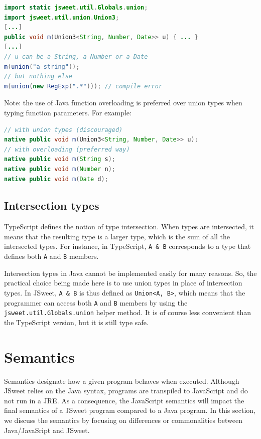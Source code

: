 \documentclass[a4paper]{report}
\begin{document}
\begin{lstlisting}[language=Java]
import static jsweet.util.Globals.union;
import jsweet.util.union.Union3;
[...]
public void m(Union3<String, Number, Date>> u) { ... }
[...]
// u can be a String, a Number or a Date
m(union("a string"));
// but nothing else
m(union(new RegExp(".*"))); // compile error
\end{lstlisting}

Note: the use of Java function overloading is preferred over union types when typing function parameters. For example:

\begin{lstlisting}[language=Java]
// with union types (discouraged)
native public void m(Union3<String, Number, Date>> u);
// with overloading (preferred way)
native public void m(String s);
native public void m(Number n);
native public void m(Date d);
\end{lstlisting}

\section{Intersection types}

TypeScript defines the notion of type intersection. When types are intersected, it means that the resulting type is a larger type, which is the sum of all the intersected types. For instance, in TypeScript, \texttt{A \& B} corresponds to a type that defines both \texttt{A} and \texttt{B} members.

Intersection types in Java cannot be implemented easily for many reasons. So, the practical choice being made here is to use union types in place of intersection types. In JSweet, \texttt{A \& B} is thus defined as \texttt{Union<A, B>}, which means that the programmer can access both \texttt{A} and \texttt{B} members by using the \texttt{jsweet\-.util\-.Globals\-.union} helper method. It is of course less convenient than the TypeScript version, but it is still type safe.

\chapter{Semantics}
\label{semantics}

Semantics designate how a given program behaves when executed. Although JSweet relies on the Java syntax, programs are transpiled to JavaScript and do not run in a JRE. As a consequence, the JavaScript semantics will impact the final semantics of a JSweet program compared to a Java program. In this section, we discuss the semantics by focusing on differences or commonalities between Java/JavaSript and JSweet.
\end{document}
